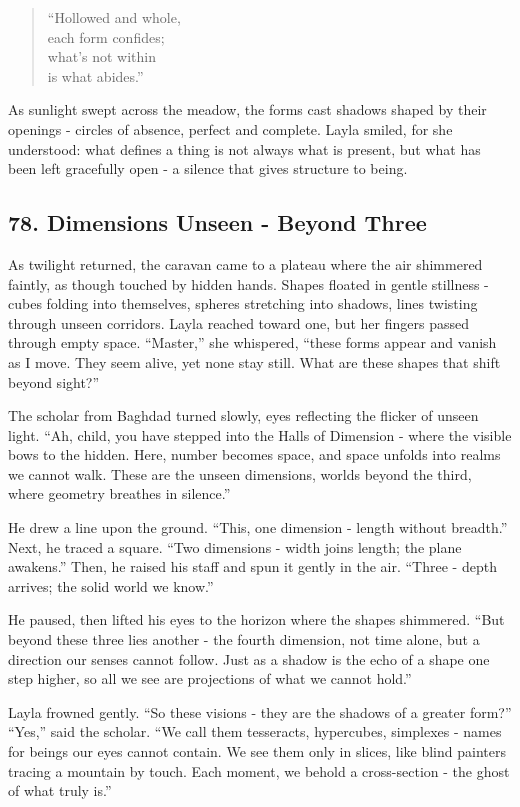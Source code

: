 \documentclass[
  letterpaper,
  DIV=11,
  numbers=noendperiod]{scrreprt}
\begin{document}
\begin{quote}
``Hollowed and whole,\\
each form confides;\\
what's not within\\
is what abides.''
\end{quote}

As sunlight swept across the meadow, the forms cast shadows shaped by
their openings - circles of absence, perfect and complete. Layla smiled,
for she understood: what defines a thing is not always what is present,
but what has been left gracefully open - a silence that gives structure
to being.

\subsection{78. Dimensions Unseen - Beyond
Three}\label{dimensions-unseen---beyond-three}

As twilight returned, the caravan came to a plateau where the air
shimmered faintly, as though touched by hidden hands. Shapes floated in
gentle stillness - cubes folding into themselves, spheres stretching
into shadows, lines twisting through unseen corridors. Layla reached
toward one, but her fingers passed through empty space. ``Master,'' she
whispered, ``these forms appear and vanish as I move. They seem alive,
yet none stay still. What are these shapes that shift beyond sight?''

The scholar from Baghdad turned slowly, eyes reflecting the flicker of
unseen light. ``Ah, child, you have stepped into the Halls of Dimension
- where the visible bows to the hidden. Here, number becomes space, and
space unfolds into realms we cannot walk. These are the unseen
dimensions, worlds beyond the third, where geometry breathes in
silence.''

He drew a line upon the ground. ``This, one dimension - length without
breadth.'' Next, he traced a square. ``Two dimensions - width joins
length; the plane awakens.'' Then, he raised his staff and spun it
gently in the air. ``Three - depth arrives; the solid world we know.''

He paused, then lifted his eyes to the horizon where the shapes
shimmered. ``But beyond these three lies another - the fourth dimension,
not time alone, but a direction our senses cannot follow. Just as a
shadow is the echo of a shape one step higher, so all we see are
projections of what we cannot hold.''

Layla frowned gently. ``So these visions - they are the shadows of a
greater form?'' ``Yes,'' said the scholar. ``We call them tesseracts,
hypercubes, simplexes - names for beings our eyes cannot contain. We see
them only in slices, like blind painters tracing a mountain by touch.
Each moment, we behold a cross-section - the ghost of what truly is.''
\end{document}
